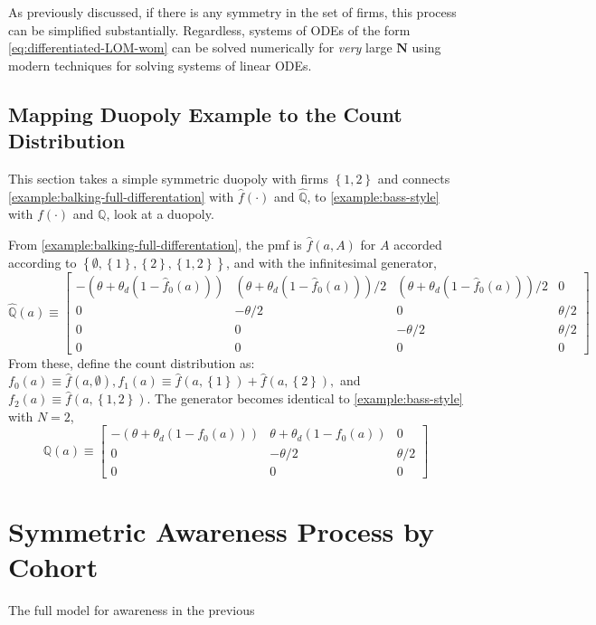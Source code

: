 \documentclass[12pt]{article}
\newcommand{\set}[1]{\ensuremath{\left\{{#1}\right\}}}
\newcommand{\Q}[0]{\ensuremath{\mathbb{Q}}}
\begin{document}
As previously discussed, if there is any symmetry in the set of firms, this process can be simplified substantially.  Regardless, systems of ODEs of the form \cref{eq:differentiated-LOM-wom} can be solved numerically for \textit{very} large $\mathbf{N}$ using modern techniques for solving systems of linear ODEs.

\subsection{Mapping Duopoly Example to the Count Distribution}\label{sec:mapping-duopoly}
This section takes a simple symmetric duopoly with firms $\set{1,2}$ and connects \cref{example:balking-full-differentation} with $\hat{f}(\cdot)$  and $\hat{\Q}$, to \cref{example:bass-style}  with $f(\cdot)$ and $\Q$, look at a duopoly.

From \cref{example:balking-full-differentation}, the pmf is $\hat{f}(a, A)$ for $A$ accorded according to $\set{\emptyset, \set{1}, \set{2}, \set{1,2}}$, and with the infinitesimal generator,
\begin{equation}
\hat{\Q}(a) \equiv \begin{bmatrix}
-(\theta + \theta_d(1 - \hat{f}_0(a))) & (\theta + \theta_d(1 - \hat{f}_0(a)))/2 & (\theta + \theta_d(1 - \hat{f}_0(a)))/2 & 0\\
0 & -\theta/2 & 0 & \theta/2\\
0 & 0 & -\theta/2 & \theta/2\\
0 & 0 & 0 & 0
\end{bmatrix}
\end{equation}
From these, define the count distribution as: $f_0(a) \equiv \hat{f}(a, \emptyset), f_1(a) \equiv \hat{f}(a, \set{1}) + \hat{f}(a, \set{2}),$ and $ f_2(a) \equiv \hat{f}(a, \set{1,2})$.  The generator becomes identical to  \cref{example:bass-style} with $N=2$,
\begin{equation}
\Q(a) \equiv \begin{bmatrix}
-(\theta + \theta_d(1 - f_0(a))) & \theta + \theta_d(1 - f_0(a))& 0\\
0 & -\theta/2 & \theta/2\\
0 & 0 & 0
\end{bmatrix}
\end{equation}

\section{Symmetric Awareness Process by Cohort}\label{sec:cohort-symmetry}
The full model for awareness in the previous 
\end{document}
